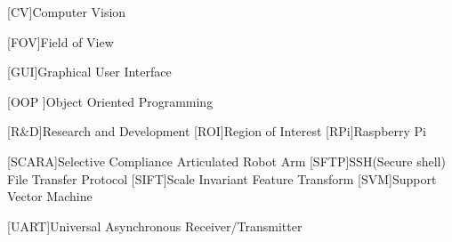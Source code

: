 \begin{acronym}
	[CV]{Computer Vision}
	
	[FOV]{Field of View}
	
	[GUI]{Graphical User Interface}
	
	[OOP ]{Object Oriented Programming }
	
	[R\&D]{Research and Development}
	[ROI]{Region of Interest}
	[RPi]{Raspberry Pi}
			
	[SCARA]{Selective Compliance Articulated Robot Arm}
	[SFTP]{SSH(Secure shell) File Transfer Protocol}
	[SIFT]{Scale Invariant Feature Transform}
	[SVM]{Support Vector Machine}
	
	[UART]{Universal Asynchronous Receiver/Transmitter}
\end{acronym}

